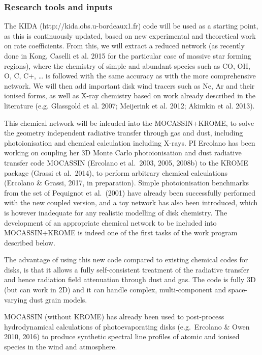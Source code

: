 \documentclass[10pt,fleqn,twoside]{article}
\begin{document}
\subsubsection{Research tools and inputs}

The KIDA (http://kida.obs.u-bordeaux1.fr) code will be used as a
starting point, as this is continuously updated, based on new
experimental and theoretical work on rate coefficients.  From this, we
will extract a reduced network (as recently done in Kong, Caselli et
al. 2015 for the particular case of massive star forming regions),
where the chemistry of simple and abundant species such as CO, OH, O,
C, C+, … is followed with the same accuracy as with the more
comprehensive network.  We will then add important disk wind tracers
such as Ne, Ar and their ionised forms, as well as X-ray chemistry
based on work already described in the literature (e.g. Glassgold et
al. 2007; Meijerink et al. 2012; Akimkin et al. 2013).  

This chemical network will be inlcuded into the MOCASSIN+KROME, to solve the geometry independent radiative transfer through gas  and dust, including photoionisation and chemical calculation
  including X-rays. PI Ercolano has been working on coupling her 3D Monte Carlo photoionisation
and dust radiative transfer code MOCASSIN (Ercolano et al.\ 2003, 2005,
2008b) to the KROME package (Grassi et al.\ 2014), to perform arbitrary
chemical calculations (Ercolano \& Grassi, 2017, in
preparation). Simple photoionisation benchmarks from the set of
Pequignot et al.\ (2001) have already been successfully performed with
the new coupled version, and a toy network has also
been introduced, which is however inadequate for any realistic
modelling of disk chemistry. The development of an appropriate
chemical network to be included into MOCASSIN+KROME is indeed one of
the first tasks of the work program described below.

The advantage of using this new code compared to existing chemical
codes for disks, is that it allows a fully self-consistent treatment
of the radiative transfer and hence radiation field attenuation
through dust and gas. The code is fully 3D (but can work in 2D) and it
can handle complex, multi-component and space-varying dust grain models. 

MOCASSIN (without KROME) has already been used to post-process
hydrodynamical calculations of photoevaporating disks (e.g.\ Ercolano
\& Owen 2010, 2016) to produce synthetic spectral line profiles of
atomic and ionised species in the wind and atmosphere. 
\end{document}
